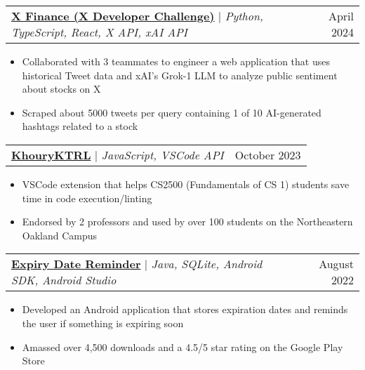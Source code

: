 \documentclass[letterpaper,11pt]{article}
\makeatletter
\newcommand{\resumeItem}[1]{
  \item\small{
    {#1 \vspace{-2pt}}
  }
}
\newcommand{\resumeProjectHeading}[2]{
    \item
    \begin{tabular*}{0.97\textwidth}{l@{\extracolsep{\fill}}r}
      \small#1 & #2 \\
    \end{tabular*}\vspace{-7pt}
}
\newcommand{\resumeItemListStart}{\begin{itemize}}
\newcommand{\resumeItemListEnd}{\end{itemize}\vspace{-5pt}}
\makeatother
\begin{document}
    \resumeProjectHeading
      {\href{https://github.com/anish-sahoo/XDevChallenge}{\textbf{X Finance (X Developer Challenge)}} $|$ \emph{Python, TypeScript, React, X API, xAI API}}{April 2024}
      \resumeItemListStart
        \resumeItem{Collaborated with 3 teammates to engineer a web application that uses historical Tweet data and xAI's Grok-1 LLM to analyze public sentiment about stocks on X}
        \resumeItem{Scraped about 5000 tweets per query containing 1 of 10 AI-generated hashtags related to a stock}
      \resumeItemListEnd

      

    \resumeProjectHeading
      {\href{https://github.com/anish-sahoo/khouryktrl}{\textbf{KhouryKTRL}} $|$ \emph{JavaScript, VSCode API}}{October 2023}
      \resumeItemListStart
        \resumeItem{VSCode extension that helps CS2500 (Fundamentals of CS 1) students save time in code execution/linting}
        \resumeItem{Endorsed by 2 professors and used by over 100 students on the Northeastern Oakland Campus}
      \resumeItemListEnd

    \resumeProjectHeading
      {\href{https://play.google.com/store/apps/details?id=com.anish.expirydatereminder}{\textbf{Expiry Date Reminder}} $|$ \emph{Java, SQLite, Android SDK, Android Studio}}{August 2022}
      \resumeItemListStart
        \resumeItem{Developed an Android application that stores expiration dates and reminds the user if something is expiring soon}
        \resumeItem{Amassed over 4,500 downloads and a 4.5/5 star rating on the Google Play Store}
      \resumeItemListEnd

    
\end{document}
